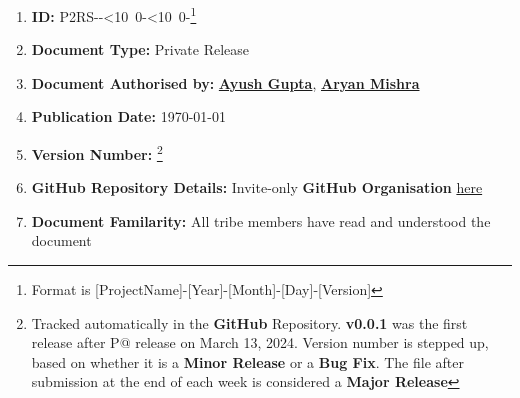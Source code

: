 \renewcommand{\thefootnote}{\alph{footnote}}
\def\mydate{\leavevmode\hbox{\the\year-\twodigits\month-\twodigits\day}}
\def\twodigits#1{\ifnum#1<10 0\fi\the#1}
\begin{enumerate}[itemsep = 0.1 pt]
\item{
\textbf{ID:} \hypertarget{Target_DocInfo}{P2RS-\mydate-}\footnote{Format is [ProjectName]-[Year]-[Month]-[Day]-[Version]}
}
      \item{
            \textbf{Document Type:} Private Release
            }

      \item{
            \textbf{Document Authorised by:} \textbf{\href{mailto:mt1210697@maths.iitd.ac.in}{Ayush Gupta}}, \href{mailto:ee1210137@ee.iitd.ac.in}{\textbf{Aryan Mishra}}}

      \item{
            \textbf{Publication Date:} \today
            }

      \item
            {
            \textbf{Version Number:} \hypertarget{Target_Ver}{}\footnote{Tracked automatically in the \textbf{GitHub} Repository.
                  \textbf{v0.0.1} was the first release after P@ release on March 13, 2024.
                  Version number is stepped up, based on whether it is a \textbf{Minor Release} or a \textbf{Bug Fix}.
                  The file after submission at the end of each week is considered a \textbf{Major Release}}
            }

      \item{\textbf{GitHub Repository Details:} Invite-only \textbf{GitHub Organisation}
            \href{https://github.com/ELP305-Cleaning-Machine}{here}
            }
        \item{\textbf{Document Familarity:} All tribe members have read and understood the document}
\end{enumerate}
